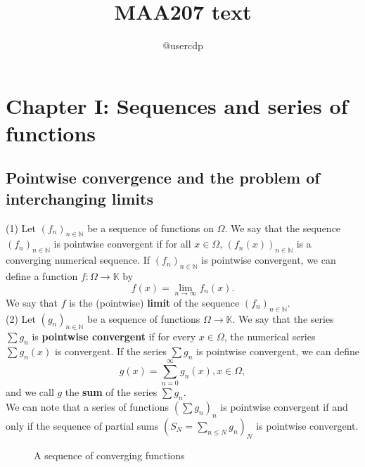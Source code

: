 \documentclass{article}
\title{MAA207 text}
\author{@usercdp}
\date{}
\newcounter{counter}[subsection] %
\newcommand{\counterbox}{\thesubsection.\arabic{counter}}
\newcommand{\definition}[2]{ %
    \stepcounter{counter}
    \begin{tcolorbox}[
        colback=green!10!white, %
        colframe=green!70!blue!30!white, %
        coltitle=black, %
        fonttitle=\bfseries, %
        title={{Definition \counterbox: #1}}, %
        enhanced, %
        boxed title style={
            colback=cyan!60!black, %
            outer arc=0pt, %
            arc=0pt, %
        },
        before upper={\noindent}, %
    ]
    #2 %
    \end{tcolorbox}
}
\begin{document}
\maketitle

\section{Chapter I: Sequences and series of functions}

\subsection{Pointwise convergence and the problem of interchanging limits}

\definition{Pointwise convergence}{
(1) Let $(f_n)_{n\in\mathbb{N}}$ be a sequence of functions on $\Omega$. We say that the sequence $(f_n)_{n\in\mathbb{N}}$ is pointwise convergent if for all $x\in\Omega$, $(f_n(x))_{n\in\mathbb{N}}$ is a converging numerical sequence. If $(f_n)_{n\in\mathbb{N}}$ is pointwise convergent, we can define a function $f:\Omega\rightarrow\mathbb{K}$ by $$f(x)=\displaystyle\lim_{n\rightarrow\infty}f_n(x).$$ We say that $f$ is the (pointwise) \textbf{limit} of the sequence $(f_n)_{n\in\mathbb{N}}.$
\\

(2) Let $(g_n)_{n\in\mathbb{N}}$ be a sequence of functions $\Omega\rightarrow\mathbb{K}$. We say that the series $\sum g_n$ is \textbf{pointwise convergent} if for every $x\in\Omega$, the numerical series $\sum g_n(x)$ is convergent. If the series $\sum g_n$ is pointwise convergent, we can define $$g(x)=\displaystyle\sum_{n=0}^\infty g_n(x), x\in\Omega,$$ and we call $g$ the \textbf{sum} of the series $\sum g_n.$
\\

We can note that a series of functions $(\sum g_n)_n$ is pointwise convergent if and only if the sequence of partial sums $(S_N=\sum_{n\leq N}g_n)_N$ is pointwise convergent.
}

\vspace{-10pt}

\begin{figure}[htbp]
    \centering
  \scalebox{0.45}{}
  \vspace{-16pt}
  \caption{A sequence of converging functions}
  \label{fig:example}
\end{figure}

\vspace{-10pt}
\end{document}
